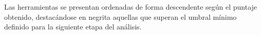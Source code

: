 Las herramientas se presentan ordenadas de forma descendente según el puntaje obtenido, destacándose en negrita aquellas que superan el umbral mínimo definido para la siguiente etapa del análisis.

